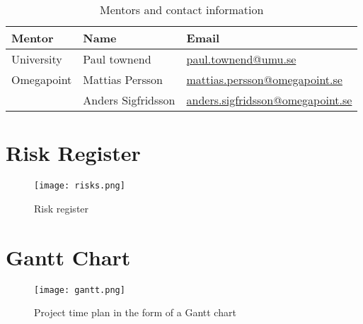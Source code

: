 \begin{table}[h!]
    \centering
    \begin{tabular}{l|l|l}
        \textbf{Mentor} & \textbf{Name} & \textbf{Email} \\
        \hline
        University & Paul townend & \href{mailto:paul.townend@umu.se}{paul.townend@umu.se} \\
        \hline
        Omegapoint & Mattias Persson & \href{mailto:mattias.persson@omegapoint.se}{mattias.persson@omegapoint.se} \\
                   & Anders Sigfridsson & \href{mailto:anders.sigfridsson@omegapoint.se}{anders.sigfridsson@omegapoint.se} \\    
    \end{tabular}
    \caption{Mentors and contact information}
    \label{tab:mentors}
\end{table}

\section{Risk Register}
\begin{sidewaysfigure}[h!]
    \centering
    \texttt{[image: risks.png]}
    \caption{Risk register}
    \label{fig:risk_register}
\end{sidewaysfigure}

\section{Gantt Chart}
\begin{sidewaysfigure}[h!]
    \centering
    \texttt{[image: gantt.png]}
    \caption{Project time plan in the form of a Gantt chart}
    \label{fig:gantt}
\end{sidewaysfigure}